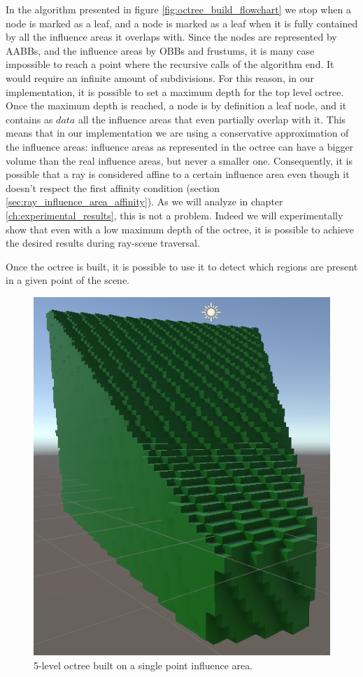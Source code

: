 \documentclass{PoliMi_MasterThesis}
\begin{document}
In the algorithm presented in figure \ref{fig:octree_build_flowchart} we stop when a node is marked as a leaf, and a node is marked as a leaf when it is fully contained by all the influence areas it overlaps with. Since the nodes are represented by AABBs, and the influence areas by OBBs and frustums, it is many case impossible to reach a point where the recursive calls of the algorithm end. It would require an infinite amount of subdivisions. For this reason, in our implementation, it is possible to set a maximum depth for the top level octree. Once the maximum depth is reached, a node is by definition a leaf node, and it contains as $data$ all the influence areas that even partially overlap with it. This means that in our implementation we are using a conservative approximation of the influence areas: influence areas as represented in the octree can have a bigger volume than the real influence areas, but never a smaller one. Consequently, it is possible that a ray is considered affine to a certain influence area even though it doesn't respect the first affinity condition (section \ref{sec:ray_influence_area_affinity}). As we will analyze in chapter \ref{ch:experimental_results}, this is not a problem. Indeed we will experimentally show that even with a low maximum depth of the octree, it is possible to achieve the desired results during ray-scene traversal.

Once the octree is built, it is possible to use it to detect which regions are present in a given point of the scene.

\begin{figure}[H]
    \centering
    \includegraphics[width=\textwidth]{Images/octree_dense_visualizer.png}
    \caption{5-level octree built on a single point influence area.}
    \label{fig:octree_dense_visualizer}
\end{figure}
\end{document}
